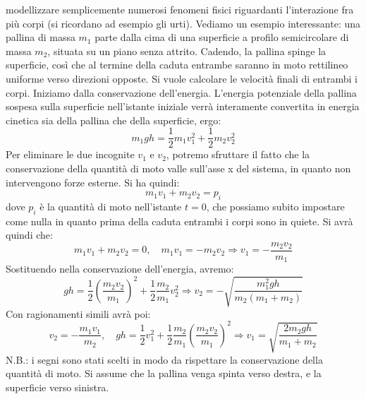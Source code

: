 \documentclass[a4paper,12pt]{article}
\begin{document}
modellizzare semplicemente numerosi fenomeni fisici riguardanti l'interazione fra più corpi (si ricordano ad 
esempio gli urti). Vediamo un esempio interessante: una pallina di massa $m_1$ parte dalla cima di una superficie a profilo
semicircolare di massa $m_2$, situata su un piano senza attrito. Cadendo, la pallina spinge la superficie, così che al termine
della caduta entrambe saranno in moto rettilineo uniforme verso direzioni opposte. Si vuole calcolare le velocità finali di entrambi
i corpi. Iniziamo dalla conservazione dell'energia. L'energia potenziale della pallina sospesa sulla superficie nell'istante iniziale
verrà interamente convertita in energia cinetica sia della pallina che della superficie, ergo:
$$ m_1gh = \frac{1}{2}m_1v_1^2 + \frac{1}{2}m_2v_2^2 $$
Per eliminare le due incognite $v_1$ e $v_2$, potremo sfruttare il fatto che la conservazione della quantità di moto
valle sull'asse x del sistema, in quanto non intervengono forze esterne. Si ha quindi:
$$ m_1v_1 + m_2v_2 = p_i $$
dove $p_i$ è la quantità di moto nell'istante $t=0$, che possiamo subito impostare come nulla in quanto prima della
caduta entrambi i corpi sono in quiete. Si avrà quindi che:
$$ m_1v_1 +m_2v_2 = 0, \quad m_1v_1 = -m_2v_2 \Rightarrow v_1 = -\frac{m_2v_2}{m_1}$$
Sostituendo nella conservazione dell'energia, avremo:
$$ gh = \frac{1}{2}(\frac{m_2v_2}{m_1})^2+\frac{1}{2}\frac{m_2}{m_1}v_2^2 \Rightarrow v_2 = -\sqrt{\frac{m_1^2gh}{m_2(m_1+m_2)}}$$
Con ragionamenti simili avrà poi:
$$ v_2 = -\frac{m_1v_1}{m_2}, \quad gh = \frac{1}{2}v_1^2 + \frac{1}{2}\frac{m_2}{m_1}(\frac{m_2v_2}{m_1})^2 \Rightarrow v_1 = \sqrt{\frac{2m_2gh}{m_1+m_2}} $$
N.B.: i segni sono stati scelti in modo da rispettare la conservazione della quantità di moto. Si assume che la pallina venga
spinta verso destra, e la superficie verso sinistra.
\end{document}
